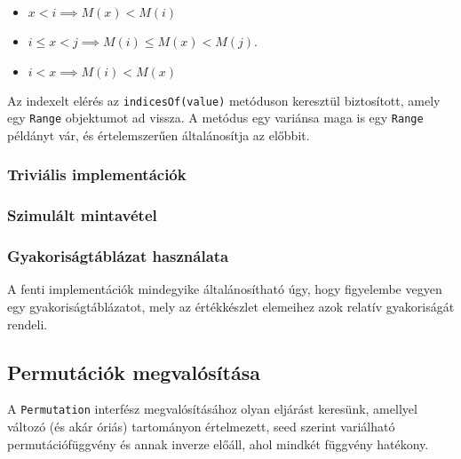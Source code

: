 \documentclass[
    parspace,
    noindent,
    nohyp,
]{elteiktdk}[2023/04/10]
\begin{document}
\begin{itemize}
\item $x < i \implies M(x) < M(i)$
\item $i \leq x < j \implies M(i) \leq M(x) < M(j)$.
\item $i < x \implies M(i) < M(x)$
\end{itemize}

Az indexelt elérés az \texttt{indicesOf(value)} metóduson keresztül biztosított, amely egy \texttt{Range} objektumot ad vissza.
A metódus egy variánsa maga is egy \texttt{Range} példányt vár, és értelemszerűen általánosítja az előbbit.

\subsubsection{Triviális implementációk}



\subsubsection{Szimulált mintavétel}



\subsubsection{Gyakoriságtáblázat használata}

A fenti implementációk mindegyike általánosítható úgy, hogy figyelembe vegyen egy gyakoriságtáblázatot,
mely az értékkészlet elemeihez azok relatív gyakoriságát rendeli.


\subsection{Permutációk megvalósítása}

A \texttt{Permutation} interfész megvalósításához olyan eljárást keresünk, amellyel változó (és akár óriás) tartományon értelmezett,
seed szerint variálható permutációfüggvény és annak inverze előáll, ahol mindkét függvény hatékony.
\end{document}
